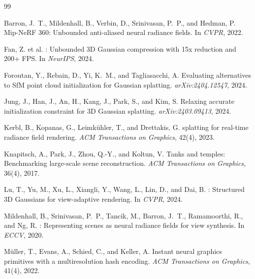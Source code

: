 \documentclass[12pt, a4paper]{article}
\begin{document}

\begin{thebibliography}{99}

Barron, J.~T., Mildenhall, B., Verbin, D., Srinivasan, P.~P., and Hedman, P.
\newblock Mip-{NeRF} 360: Unbounded anti-aliased neural radiance fields.
\newblock In \emph{CVPR}, 2022.

Fan, Z. et al.
: Unbounded 3{D} {Gaussian} compression with 15x
reduction and 200+ {FPS}.
\newblock In \emph{NeurIPS}, 2024.

Foroutan, Y., Rebain, D., Yi, K.~M., and Tagliasacchi, A.
\newblock Evaluating alternatives to {SfM} point cloud initialization for
{Gaussian} splatting.
\newblock \emph{arXiv:2404.12547}, 2024.

Jung, J., Han, J., An, H., Kang, J., Park, S., and Kim, S.
\newblock Relaxing accurate initialization constraint for {3D} {Gaussian}
splatting.
\newblock \emph{arXiv:2403.09413}, 2024.

Kerbl, B., Kopanas, G., Leimk\"{u}hler, T., and Drettakis, G.
 splatting for real-time radiance field rendering.
\newblock \emph{ACM Transactions on Graphics}, 42(4), 2023.

Knapitsch, A., Park, J., Zhou, Q.-Y., and Koltun, V.
\newblock Tanks and temples: Benchmarking large-scale scene reconstruction.
\newblock \emph{ACM Transactions on Graphics}, 36(4), 2017.

Lu, T., Yu, M., Xu, L., Xiangli, Y., Wang, L., Lin, D., and Dai, B.
: Structured 3{D} {Gaussians} for view-adaptive
rendering.
\newblock In \emph{CVPR}, 2024.

Mildenhall, B., Srinivasan, P.~P., Tancik, M., Barron, J.~T., Ramamoorthi, R.,
and Ng, R.
: Representing scenes as neural radiance fields for view
synthesis.
\newblock In \emph{ECCV}, 2020.

M\"{u}ller, T., Evans, A., Schied, C., and Keller, A.
\newblock Instant neural graphics primitives with a multiresolution hash
encoding.
\newblock \emph{ACM Transactions on Graphics}, 41(4), 2022.


\end{thebibliography}
\end{document}

